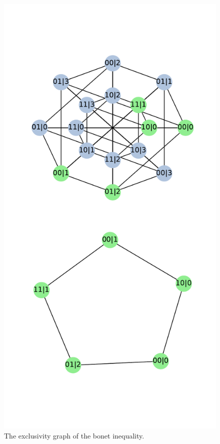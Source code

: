 \documentclass[floatfix, twocolumn, aps, prl]{revtex4-1}
\begin{document}
\begin{figure}[h]
    \centering
    \includegraphics[width=.8\columnwidth]{images/instrumental_c5.pdf}
    \caption{The exclusivity graph of the bonet inequality.}
    \label{fig:bonetexc}
\end{figure}
\end{document}
